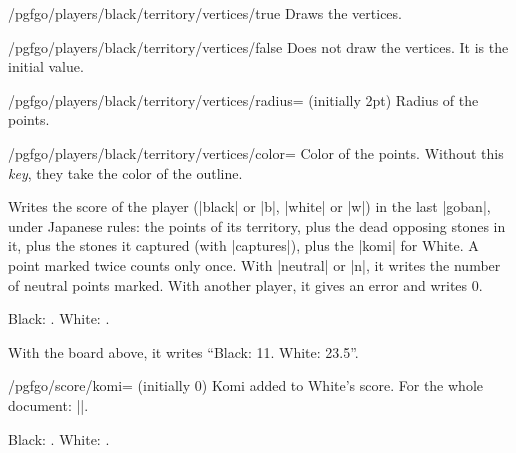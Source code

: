 	\begin{key}{/pgfgo/players/black/territory/vertices/true}
		Draws the vertices.
	\end{key}

	\begin{key}{/pgfgo/players/black/territory/vertices/false}
		Does not draw the vertices. It is the initial value.
	\end{key}

	\begin{key}{/pgfgo/players/black/territory/vertices/radius= (initially 2pt)}
		Radius of the points.
	\end{key}

	\begin{key}{/pgfgo/players/black/territory/vertices/color=}
		Color of the points. Without this \emph{key}, they take the color of the outline.

		\begin{codeexample}[]
			\begin{goban}[5]
			\end{goban}
		\end{codeexample}
	\end{key}

	\begin{command}{\pgfgoscore{}}
		Writes the score of the player (|black| or |b|, |white| or |w|) in the last |goban|, under Japanese rules: the points of its territory, plus the dead opposing stones in it, plus the stones it captured (with |captures|), plus the |komi| for White. A point marked twice counts only once. With |neutral| or |n|, it writes the number of neutral points marked. With another player, it gives an error and writes 0.

		\begin{codeexample}
			Black: . White: .
		\end{codeexample}

		With the board above, it writes ``Black: 11. White: 23.5''.
	\end{command}

	\begin{key}{/pgfgo/score/komi= (initially 0)}
		Komi added to White's score. For the whole document: ||.

		\begin{codeexample}[]
			\begin{goban}[5]
			\end{goban}

			Black: . White: .
		\end{codeexample}
	\end{key}


